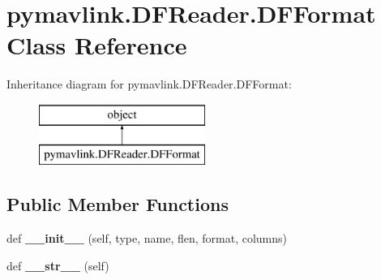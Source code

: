 \hypertarget{classpymavlink_1_1DFReader_1_1DFFormat}{}\section{pymavlink.\+D\+F\+Reader.\+D\+F\+Format Class Reference}
\label{classpymavlink_1_1DFReader_1_1DFFormat}
Inheritance diagram for pymavlink.\+D\+F\+Reader.\+D\+F\+Format\+:\begin{figure}[H]
\begin{center}
\leavevmode
\includegraphics[height=2.000000cm]{classpymavlink_1_1DFReader_1_1DFFormat}
\end{center}
\end{figure}
\subsection*{Public Member Functions}
\begin{DoxyCompactItemize}
\item 
\mbox{\label{classpymavlink_1_1DFReader_1_1DFFormat_a624300e91dbf0a331469d34dcc70ed00}} 
def {\bfseries \+\_\+\+\_\+init\+\_\+\+\_\+} (self, type, name, flen, format, columns)
\item 
\mbox{\label{classpymavlink_1_1DFReader_1_1DFFormat_a9eb36a2ab990afd802d5088d9af10e96}} 
def {\bfseries \+\_\+\+\_\+str\+\_\+\+\_\+} (self)
\end{DoxyCompactItemize}
